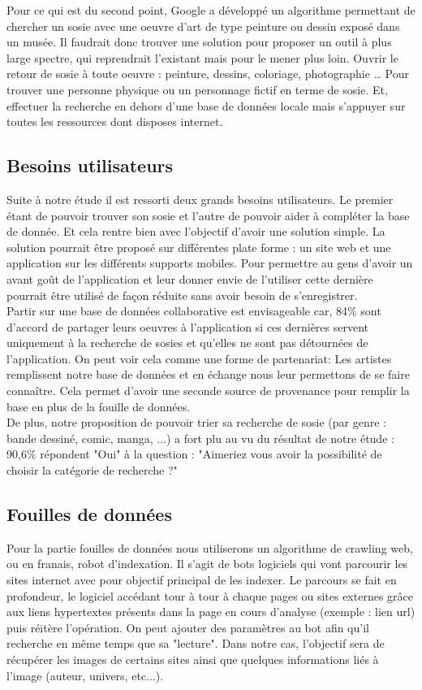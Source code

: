 \documentclass[a4paper,12pt]{article}
\begin{document}
Pour ce qui est du second point, Google a développé un algorithme permettant de chercher un sosie avec une oeuvre d’art de type peinture ou dessin exposé dans un musée. Il faudrait donc trouver une solution pour proposer un outil à plus large spectre, qui reprendrait l’existant mais pour le mener plus loin. 
Ouvrir le retour de sosie à toute oeuvre : peinture, dessins, coloriage, photographie … Pour trouver une personne physique ou un personnage fictif en terme de sosie. Et, effectuer la recherche en dehors d'une base de données locale mais s'appuyer sur toutes les ressources dont disposes internet. 

\subsection{Besoins utilisateurs}
Suite à notre étude il est ressorti deux grands besoins utilisateurs. Le premier étant de pouvoir trouver son sosie et l'autre de pouvoir aider à compléter la base de donnée. Et cela rentre bien avec l'objectif d'avoir une solution simple. La solution pourrait être proposé sur différentes plate forme : un site web et une application sur les différents supports mobiles. Pour permettre au gens d'avoir un avant goût de l'application et leur donner envie de l'utiliser cette dernière pourrait être utilisé de façon réduite sans avoir besoin de s'enregistrer. 
\\ Partir sur une base de données collaborative est envisageable car, 84\% sont d'accord de partager leurs oeuvres à l'application si ces dernières servent uniquement à la recherche de sosies et qu'elles ne sont pas détournées de l'application. On peut voir cela comme une forme de partenariat: Les artistes remplissent notre base de données et en échange nous leur permettons de se faire connaître. Cela permet d'avoir une seconde source de provenance pour remplir la base en plus de la fouille de données. 
\\De plus, notre proposition de pouvoir trier sa recherche de sosie (par genre : bande dessiné, comic, manga, ...) a fort plu au vu du résultat de notre étude : 90,6\% répondent "Oui" à la question : "Aimeriez vous avoir la possibilité de choisir la catégorie de recherche ?"  

\subsection{Fouilles de données}
Pour la partie fouilles de données nous utiliserons un algorithme de crawling web, ou en franais, robot d'indexation.
Il s’agit de bots logiciels qui vont parcourir les sites internet avec
pour objectif principal de les indexer. Le parcours se fait en profondeur, le
logiciel accédant tour à tour à chaque pages ou sites externes grâce aux liens
hypertextes présents dans la page en cours d’analyse (exemple : lien url) puis
réitère l’opération. On peut ajouter des paramètres au bot afin qu’il recherche
en même temps que sa "lecture". Dans notre cas, l'objectif sera de récupérer les images de certains sites ainsi que quelques informations liés à l'image (auteur, univers, etc...).
\end{document}

